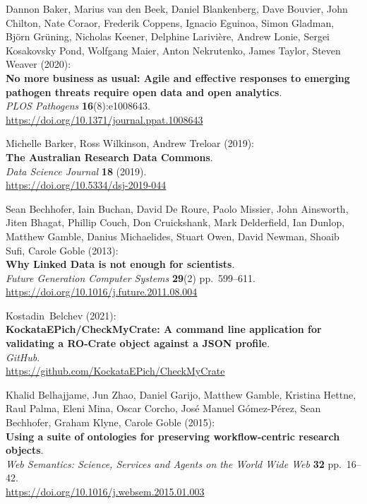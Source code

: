 \begin{thebibliography}{9}
Dannon Baker, Marius van den Beek, Daniel Blankenberg, Dave
Bouvier, John Chilton, Nate Coraor, Frederik Coppens, Ignacio Eguinoa,
Simon Gladman, Björn Grüning, Nicholas Keener, Delphine Larivière,
Andrew Lonie, Sergei Kosakovsky Pond, Wolfgang Maier, Anton Nekrutenko,
James Taylor, Steven Weaver (2020):\\
\textbf{No more business as usual: Agile and effective responses to
emerging pathogen threats require open data and open analytics}.\\
\emph{PLOS Pathogens} \textbf{16}(8):e1008643.\\
\url{https://doi.org/10.1371/journal.ppat.1008643}

Michelle Barker, Ross Wilkinson, Andrew Treloar (2019):\\
\textbf{The Australian Research Data Commons}.\\
\emph{Data Science Journal} \textbf{18} (2019).\\
\url{https://doi.org/10.5334/dsj-2019-044}

Sean Bechhofer, Iain Buchan, David De Roure, Paolo Missier,
John Ainsworth, Jiten Bhagat, Phillip Couch, Don Cruickshank, Mark
Delderfield, Ian Dunlop, Matthew Gamble, Danius Michaelides, Stuart
Owen, David Newman, Shoaib Sufi, Carole Goble (2013):\\
\textbf{Why Linked Data is not enough for scientists}.\\
\emph{Future Generation Computer Systems} \textbf{29}(2)
pp.~599--611.\\
\url{https://doi.org/10.1016/j.future.2011.08.004}

Kostadin~Belchev (2021):\\
\textbf{KockataEPich/CheckMyCrate: A command line application for
validating a RO-Crate object against a JSON profile}.\\
\emph{GitHub}.\\
\url{https://github.com/KockataEPich/CheckMyCrate}

Khalid Belhajjame, Jun Zhao, Daniel Garijo, Matthew Gamble,
Kristina Hettne, Raul Palma, Eleni Mina, Oscar Corcho, José Manuel
Gómez-Pérez, Sean Bechhofer, Graham Klyne, Carole Goble (2015):\\
\textbf{Using a suite of ontologies for preserving workflow-centric
research objects}.\\
\emph{Web Semantics: Science, Services and Agents on the World Wide Web}
\textbf{32} pp.~16--42.\\
\url{https://doi.org/10.1016/j.websem.2015.01.003}


\end{thebibliography}
